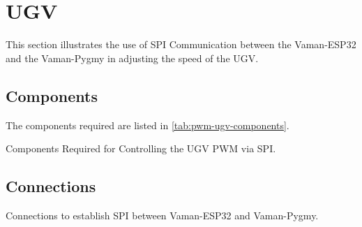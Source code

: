 \section{UGV}
This section illustrates the use of SPI Communication between the Vaman-ESP32
and the Vaman-Pygmy in adjusting the speed of the UGV.

\subsection{Components}
The components required are listed in \autoref{tab:pwm-ugv-components}.
\begin{table}[!ht]
    \centering
    
    \caption{Components Required for Controlling the UGV PWM via SPI.}
    \label{tab:pwm-ugv-components}
\end{table}

\subsection{Connections}

\begin{table}[!ht]
    \centering
    
    \caption{Connections to establish SPI between Vaman-ESP32 and Vaman-Pygmy.}
    \label{tab:pwm-ugv-connections}
\end{table}

